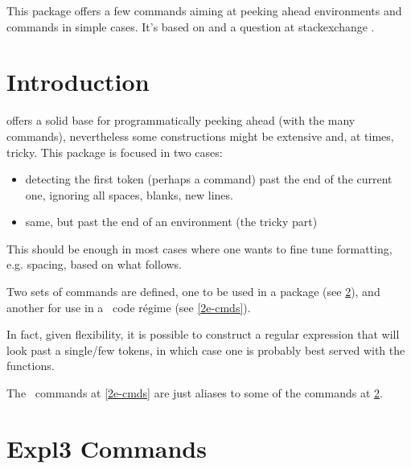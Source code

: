 \documentclass[10pt]{article}
\begin{document}
  

\begin{typesetabstract}
 
This package offers a few commands aiming at peeking ahead environments and commands in simple cases. It's based on  and a question at stackexchange \cite{stackexchange}.
\end{typesetabstract}

\tableofcontents

\section{Introduction}

 offers a solid base for programmatically peeking ahead (with the many \tsobj{\peek_} commands), nevertheless some constructions might be extensive and, at times, tricky. This package is focused in two cases:
\begin{itemize}
  \item detecting the first token (perhaps a command) past the end of the current one, ignoring all spaces, blanks, new lines.
  \item same, but past the end of an environment (the tricky part)
\end{itemize}
This should be enough in most cases where one wants to fine tune formatting, e.g. spacing, based on what follows. 

Two sets of commands are defined, one to be used in a  package (see \ref{expl3-cmds}), and another for use in a \LaTeXe\ code régime (see \ref{2e-cmds}).
\begin{tsremark}
  In fact, given  flexibility, it is possible to construct a regular expression that will look past a single/few tokens, in which case one is probably best served with the  \tsobj{\peek_} functions.
\end{tsremark}
\begin{tsremark}
  The \LaTeXe\ commands at \ref{2e-cmds} are just aliases to some of the  commands at \ref{expl3-cmds}.
\end{tsremark}



\section{Expl3 Commands}\label{expl3-cmds}
\end{document}
